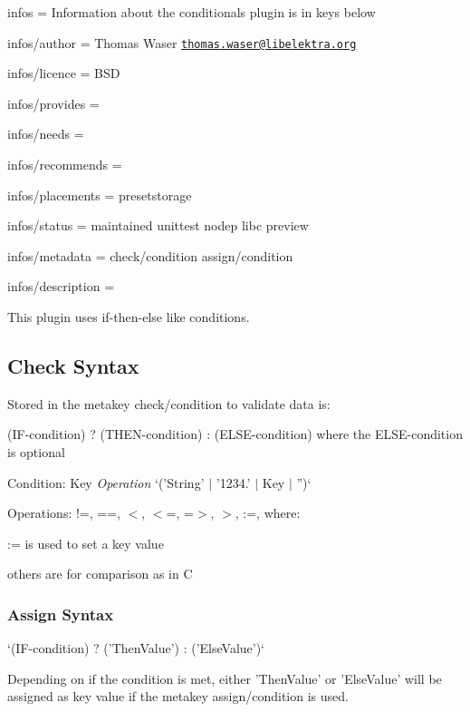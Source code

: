
\begin{DoxyItemize}
\item infos = Information about the conditionals plugin is in keys below
\item infos/author = Thomas Waser \href{mailto:thomas.waser@libelektra.org}{\tt thomas.\+waser@libelektra.\+org}
\item infos/licence = B\+S\+D
\item infos/provides =
\item infos/needs =
\item infos/recommends =
\item infos/placements = presetstorage
\item infos/status = maintained unittest nodep libc preview
\item infos/metadata = check/condition assign/condition
\item infos/description =
\end{DoxyItemize}

This plugin uses if-\/then-\/else like conditions.

\subsection*{Check Syntax}

Stored in the metakey {\ttfamily check/condition} to validate data is\+:

{\ttfamily (I\+F-\/condition) ? (T\+H\+E\+N-\/condition) \+: (E\+L\+S\+E-\/condition)} where the E\+L\+S\+E-\/condition is optional

Condition\+: {\ttfamily Key} {\itshape Operation} `('String' $\vert$ '1234.' $\vert$ Key $\vert$ '')`

Operations\+: {\ttfamily !=, ==, $<$, $<$=, =$>$, $>$, \+:=}, where\+:


\begin{DoxyItemize}
\item {\ttfamily \+:=} is used to set a key value
\item others are for comparison as in C
\end{DoxyItemize}

\subsubsection*{Assign Syntax}

`(I\+F-\/condition) ? ('Then\+Value') \+: ('Else\+Value')`

Depending on if the condition is met, either 'Then\+Value' or 'Else\+Value' will be assigned as key value if the metakey {\ttfamily assign/condition} is used.

